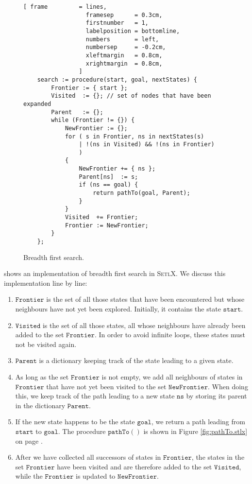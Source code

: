 \begin{figure}[!ht]
\centering
\begin{Verbatim}[ frame         = lines, 
                  framesep      = 0.3cm, 
                  firstnumber   = 1,
                  labelposition = bottomline,
                  numbers       = left,
                  numbersep     = -0.2cm,
                  xleftmargin   = 0.8cm,
                  xrightmargin  = 0.8cm,
                ]
    search := procedure(start, goal, nextStates) {
        Frontier := { start };
        Visited  := {}; // set of nodes that have been expanded
        Parent   := {};
        while (Frontier != {}) {
            NewFrontier := {};
            for ( s in Frontier, ns in nextStates(s) 
                | !(ns in Visited) && !(ns in Frontier)
                ) 
            {
                NewFrontier += { ns };
                Parent[ns]  := s;
                if (ns == goal) {
                    return pathTo(goal, Parent);
                }
            }
            Visited  += Frontier;
            Frontier := NewFrontier;
        }
    };
\end{Verbatim}
\vspace*{-0.3cm}
\caption{Breadth first search.}
\label{fig:breadth-first-search.stlx}
\end{figure}
 shows an implementation of
breadth first search in \textsc{SetlX}.  We discuss this implementation line by line:
\begin{enumerate}
\item $\mathtt{Frontier}$ is the set of all those states that have been encountered but whose
      neighbours have not yet been explored.  Initially, it contains the state $\mathtt{start}$.
\item $\mathtt{Visited}$ is the set of all those states, all whose neighbours have already been
      added to the set $\mathtt{Frontier}$.  In order to avoid infinite loops, these states must not
      be visited again.
\item $\mathtt{Parent}$ is a dictionary keeping track of the state leading to a given state.
\item As long as the set $\mathtt{Frontier}$ is not empty, we add all neighbours of states in 
      $\mathtt{Frontier}$ that have not yet been visited to the set $\mathtt{NewFrontier}$.
      When doing this, we keep track of the path leading to a new state $\mathtt{ns}$ by storing its
      parent in the dictionary $\mathtt{Parent}$.
\item If the new state happens to be the state $\mathtt{goal}$, we return a path leading from
      $\mathtt{start}$ to $\mathtt{goal}$.  The procedure $\mathtt{pathTo}()$ is shown in Figure
      \ref{fig:pathTo.stlx} on page \pageref{fig:pathTo.stlx}.
\item After we have collected all successors of states in $\mathtt{Frontier}$, the states
      in the set $\mathtt{Frontier}$ have been visited and are therefore added to the set
      $\mathtt{Visited}$, while the $\mathtt{Frontier}$ is updated to $\mathtt{NewFrontier}$.
\end{enumerate}

